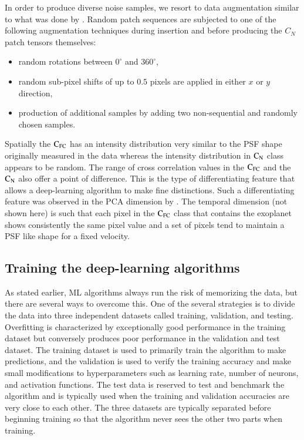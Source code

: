 \documentclass{aa}
\begin{document}
In order to produce diverse noise samples, we resort to data augmentation similar to what was done by \cite{2018Gomez}.
Random patch sequences are subjected to one of the following augmentation techniques during insertion and before producing the $C_{N}$ patch tensors themselves:
\begin{itemize}
    \item random rotations between $0^{\circ}$ and $360^{\circ}$,
    \item random sub-pixel shifts of up to $0.5$ pixels are applied in either $x$ or $y$ direction,
    \item production of additional samples by adding two non-sequential and randomly chosen samples.
\end{itemize}
Spatially the $\rm{C_{FC}}$ has an intensity distribution very similar to the PSF shape originally measured in the data whereas the intensity distribution in $\rm{C_N}$ class appears to be random.
The range of cross correlation values in the $\rm{C_{FC}}$ and the $\rm{C_N}$ also offer a point of difference.
This is the type of differentiating feature that allows a deep-learning algorithm to make fine distinctions.
Such a differentiating feature was observed in the PCA dimension by \citet{2018Gomez}.
The temporal dimension (not shown here) is such that each pixel in the $\rm{C_{FC}}$ class that contains the exoplanet shows consistently the same pixel value and a set of pixels tend to maintain a PSF like shape for a fixed velocity. 


\subsection{Training the deep-learning algorithms}

As stated earlier, ML algorithms always run the risk of memorizing the data, but there are several ways to overcome this.
One of the several strategies is to divide the data into three independent datasets called training, validation, and testing.
Overfitting is characterized by exceptionally good performance in the training dataset but conversely produces poor performance in the validation and test dataset.
The training dataset is used to primarily train the algorithm to make predictions, and the validation is used to verify the training accuracy and make small modifications to hyperparameters such as learning rate, number of neurons, and activation functions. %
The test data is reserved to test and benchmark the algorithm and is typically used when the training and validation accuracies are very close to each other.
The three datasets are typically separated before beginning training so that the algorithm never sees the other two parts when training.
\end{document}
